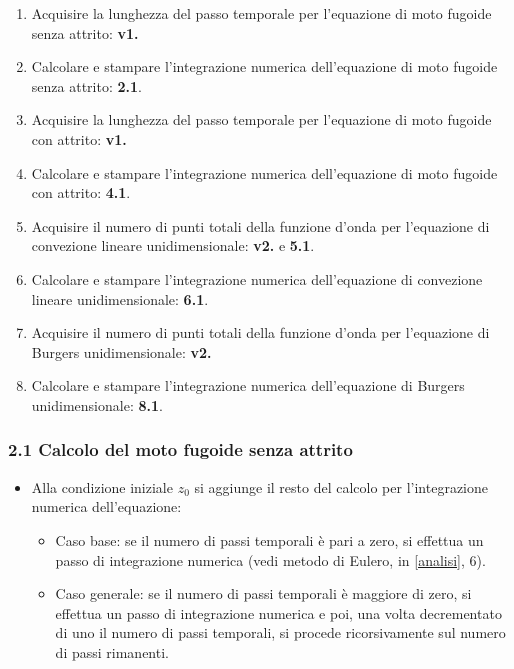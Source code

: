 \begin{enumerate}
\item Acquisire la lunghezza del passo temporale per l'equazione di moto fugoide senza attrito: \textbf{v1.}
\item Calcolare e stampare l'integrazione numerica dell'equazione di moto fugoide senza attrito: \textbf{2.1}.
\item Acquisire la lunghezza del passo temporale per l'equazione di moto fugoide con attrito: \textbf{v1.}
\item Calcolare e stampare l'integrazione numerica dell'equazione di moto fugoide con attrito: \textbf{4.1}.
\item Acquisire il numero di punti totali della funzione d'onda per l'equazione di convezione lineare unidimensionale: \textbf{v2.} e \textbf{5.1}.
\item Calcolare e stampare l'integrazione numerica dell'equazione di convezione lineare unidimensionale: \textbf{6.1}.
\item Acquisire il numero di punti totali della funzione d'onda per l'equazione di Burgers unidimensionale: \textbf{v2.}
\item Calcolare e stampare l'integrazione numerica dell'equazione di Burgers unidimensionale: \textbf{8.1}.
\end{enumerate}

\subsubsection*{2.1 Calcolo del moto fugoide senza attrito} 
\begin{itemize}
\item Alla condizione iniziale $z_0$ si aggiunge il resto del calcolo per l'integrazione numerica dell'equazione:
\begin{itemize}
\item Caso base: se il numero di passi temporali è pari a zero, si effettua un passo di integrazione numerica (vedi metodo di Eulero, in \ref{analisi}, 6).
\item Caso generale: se il numero di passi temporali è maggiore di zero, si effettua un passo di integrazione numerica e poi, una volta decrementato di uno il numero di passi temporali, si procede ricorsivamente sul numero di passi rimanenti. 
\end{itemize}
\end{itemize}

